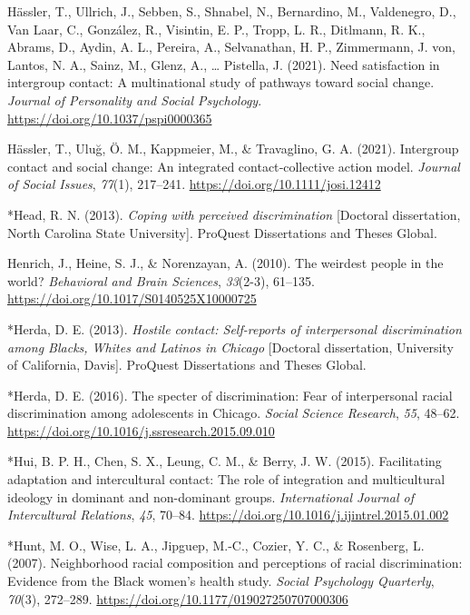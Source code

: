 \documentclass[12pt, letterpaper]{article}
\newenvironment{CSLReferences}[2]{}{}
\begin{document}
\begin{CSLReferences}{1}{0}
\leavevmode\hypertarget{ref-hassler_need_2021}{}%
Hässler, T., Ullrich, J., Sebben, S., Shnabel, N., Bernardino, M.,
Valdenegro, D., Van Laar, C., González, R., Visintin, E. P., Tropp, L.
R., Ditlmann, R. K., Abrams, D., Aydin, A. L., Pereira, A., Selvanathan,
H. P., Zimmermann, J. von, Lantos, N. A., Sainz, M., Glenz, A., \ldots{}
Pistella, J. (2021). Need satisfaction in intergroup contact: {A}
multinational study of pathways toward social change. \emph{Journal of
Personality and Social Psychology}.
\url{https://doi.org/10.1037/pspi0000365}

\leavevmode\hypertarget{ref-hassler_intergroup_2021}{}%
Hässler, T., Uluğ, Ö. M., Kappmeier, M., \& Travaglino, G. A. (2021).
Intergroup contact and social change: An integrated contact‐collective
action model. \emph{Journal of Social Issues}, \emph{77}(1), 217--241.
\url{https://doi.org/10.1111/josi.12412}

\leavevmode\hypertarget{ref-1407}{}%
*Head, R. N. (2013). \emph{Coping with perceived discrimination}
{[}Doctoral dissertation, North Carolina State University{]}. {ProQuest
Dissertations and Theses Global}.

\leavevmode\hypertarget{ref-henrich_weirdest_2010}{}%
Henrich, J., Heine, S. J., \& Norenzayan, A. (2010). The weirdest people
in the world? \emph{Behavioral and Brain Sciences}, \emph{33}(2-3),
61--135. \url{https://doi.org/10.1017/S0140525X10000725}

\leavevmode\hypertarget{ref-1494}{}%
*Herda, D. E. (2013). \emph{Hostile contact: {Self}-reports of
interpersonal discrimination among {Blacks}, {Whites} and {Latinos} in
{Chicago}} {[}Doctoral dissertation, University of California, Davis{]}.
{ProQuest Dissertations and Theses Global}.

\leavevmode\hypertarget{ref-324}{}%
*Herda, D. E. (2016). The specter of discrimination: {Fear} of
interpersonal racial discrimination among adolescents in {Chicago}.
\emph{Social Science Research}, \emph{55}, 48--62.
\url{https://doi.org/10.1016/j.ssresearch.2015.09.010}

\leavevmode\hypertarget{ref-609}{}%
*Hui, B. P. H., Chen, S. X., Leung, C. M., \& Berry, J. W. (2015).
Facilitating adaptation and intercultural contact: {The} role of
integration and multicultural ideology in dominant and non-dominant
groups. \emph{International Journal of Intercultural Relations},
\emph{45}, 70--84. \url{https://doi.org/10.1016/j.ijintrel.2015.01.002}

\leavevmode\hypertarget{ref-2001}{}%
*Hunt, M. O., Wise, L. A., Jipguep, M.-C., Cozier, Y. C., \& Rosenberg,
L. (2007). Neighborhood racial composition and perceptions of racial
discrimination: Evidence from the {Black} women's health study.
\emph{Social Psychology Quarterly}, \emph{70}(3), 272--289.
\url{https://doi.org/10.1177/019027250707000306}


\end{CSLReferences}
\end{document}
